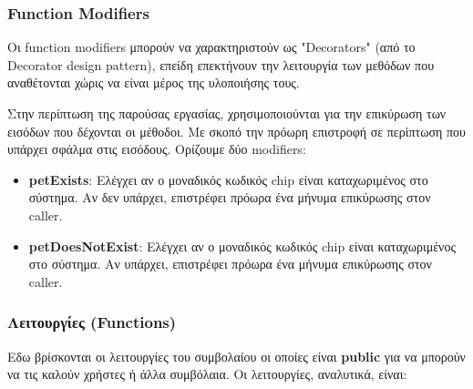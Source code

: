 \documentclass[12pt,a4paper]{article}
\begin{document}
\subsubsection{Function Modifiers}
Οι function modifiers μπορούν να χαρακτηριστούν ως "Decorators" (από το Decorator design pattern), επείδη επεκτήνουν την λειτουργία των μεθόδων που αναθέτονται χώρις να είναι μέρος της υλοποιήσης τους.

Στην περίπτωση της παρούσας εργασίας, χρησιμοποιούνται για την επικύρωση των εισόδων που δέχονται οι μέθοδοι. Με σκοπό την πρόωρη επιστροφή σε περίπτωση που υπάρχει σφάλμα στις εισόδους. Ορίζουμε δύο modifiers:
\begin{itemize}
    \item \textbf{petExists}: Ελέγχει αν ο μοναδικός κωδικός chip είναι καταχωριμένος στο σύστημα. Αν δεν υπάρχει, επιστρέφει πρόωρα ένα μήνυμα επικύρωσης στον caller.
    \item \textbf{petDoesNotExist}: Ελέγχει αν ο μοναδικός κωδικός chip είναι καταχωριμένος στο σύστημα. Αν υπάρχει, επιστρέφει πρόωρα ένα μήνυμα επικύρωσης στον caller.
\end{itemize}

\subsubsection{Λειτουργίες (Functions)}
Εδω βρίσκονται οι λειτουργίες του συμβολαίου οι οποίες είναι \textbf{public} για να μπορούν να τις καλούν χρήστες ή άλλα συμβόλαια. Οι λειτουργίες, αναλυτικά, είναι:
\end{document}
